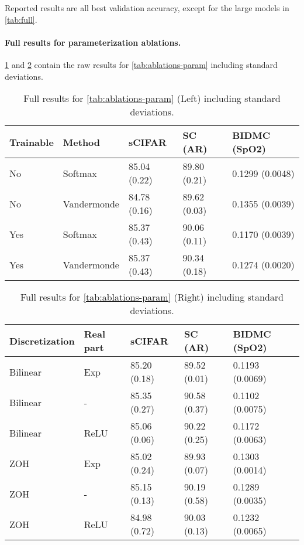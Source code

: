 \documentclass{article}
\begin{document}
Reported results are all best validation accuracy, except for the large models in \cref{tab:full}.

\paragraph{Full results for parameterization ablations.}

\cref{tab:ablations-disc-full} and \cref{tab:ablations-real-full} contain the raw results for \cref{tab:ablations-param} including standard deviations.



\begin{table}
  \caption{Full results for \cref{tab:ablations-param} (Left) including standard deviations.}
    \centering
    \begin{tabular}{@{}lllll@{}}
        \toprule
        Trainable  & Method      & sCIFAR       & SC (AR)      & BIDMC (SpO2)    \\
        \midrule
        No                     & Softmax     & 85.04 (0.22) & 89.80 (0.21) & 0.1299 (0.0048) \\
        No                     & Vandermonde & 84.78 (0.16) & 89.62 (0.03) & 0.1355 (0.0039) \\
        Yes                    & Softmax     & 85.37 (0.43) & 90.06 (0.11) & 0.1170 (0.0039) \\
        Yes                    & Vandermonde & 85.37 (0.43) & 90.34 (0.18) & 0.1274 (0.0020) \\
        \bottomrule
    \end{tabular}
    \label{tab:ablations-disc-full}
\end{table}

\begin{table}
  \caption{Full results for \cref{tab:ablations-param} (Right) including standard deviations.}
    \centering
    \begin{tabular}{@{}lllll@{}}
        \toprule
        Discretization & Real part & sCIFAR       & SC (AR)      & BIDMC (SpO2)    \\
        \midrule
        Bilinear       & Exp       & 85.20 (0.18) & 89.52 (0.01) & 0.1193 (0.0069) \\
        Bilinear       & -         & 85.35 (0.27) & 90.58 (0.37) & 0.1102 (0.0075) \\
        Bilinear       & ReLU      & 85.06 (0.06) & 90.22 (0.25) & 0.1172 (0.0063) \\
        ZOH            & Exp       & 85.02 (0.24) & 89.93 (0.07) & 0.1303 (0.0014) \\
        ZOH            & -         & 85.15 (0.13) & 90.19 (0.58) & 0.1289 (0.0035) \\
        ZOH            & ReLU      & 84.98 (0.72) & 90.03 (0.13) & 0.1232 (0.0065) \\
        \bottomrule
    \end{tabular}
    \label{tab:ablations-real-full}
\end{table}
\end{document}
